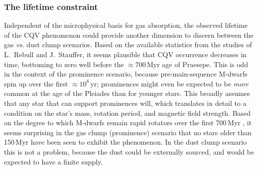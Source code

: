 \documentclass[11pt,twocolumn,tighten]{aastex63}
\begin{document}

\subsubsection{The lifetime constraint}
Independent of the microphysical basis for gas absorption, the observed
lifetime of the CQV phenomenon could provide another dimension to discern between
the gas {\it vs.} dust clump scenarios.
Based on the available statistics from the studies of L.~Rebull and J.~Stauffer,
it seems plausible that CQV occurrence decreases in time, bottoming to zero
well before the $\approx$700\,Myr age of Praesepe.
This is odd in the context of the prominence scenario, because pre-main-sequence
M-dwarfs spin up over the first $\approx$$10^8$\,yr;
prominences might even be expected to be {\it more} common at the 
age of the Pleiades than for younger stars.
This broadly assumes that any star that can support prominences will,
which translates in detail to a condition on the star's mass, rotation
period, and magnetic field strength.
Based on the degree to which M-dwarfs remain rapid rotators over the first 700\,Myr
\citep[e.g. Figure~13 of][]{2022AJ....164...80R}, 
it seems surprising in the gas clump (prominence) scenario that no stars
older than 150\,Myr have been seen to exhibit the phenomenon.
In the dust clump scenario this is not a problem, because the dust could
be externally sourced, and would be expected to have a finite supply.
\end{document}
